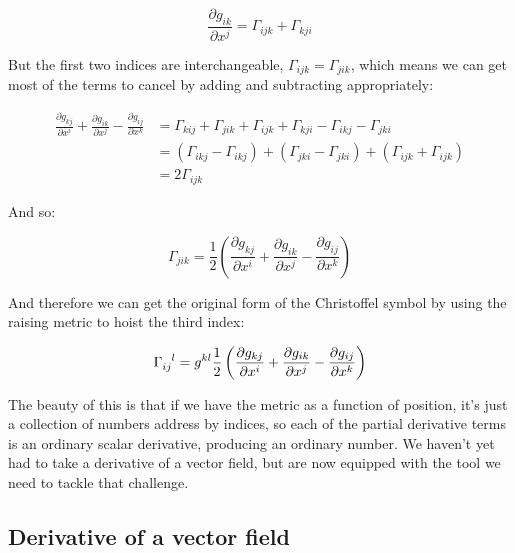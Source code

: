 \begin{equation}
\frac{\partial g_{ik}}{\partial x^j} 
=
\Gamma_{ijk}+\Gamma_{kji}
\end{equation}

But the first two indices are interchangeable, $\Gamma_{ijk} = \Gamma_{jik}$, which means we can get most of the terms to cancel by adding and subtracting appropriately:

\begin{equation}
    \begin{split}
        \frac{\partial g_{kj}}{\partial x^i} 
        +
        \frac{\partial g_{ik}}{\partial x^j} 
        -
        \frac{\partial g_{ij}}{\partial x^k}
        &=
        \Gamma_{kij}+\Gamma_{jik}
        +
        \Gamma_{ijk}+\Gamma_{kji}
        -
        \Gamma_{ikj}-\Gamma_{jki} \\
        &=        
        (\Gamma_{ikj}-\Gamma_{ikj})
        +
        (\Gamma_{jki}-\Gamma_{jki})
        +
        (\Gamma_{ijk}+\Gamma_{ijk}) \\
        &= 2\Gamma_{ijk}       
    \end{split}
\end{equation}

And so:

\begin{equation}
\Gamma_{jik}
=
\frac{1}{2}
\left(
\frac{\partial g_{kj}}{\partial x^i} 
+
\frac{\partial g_{ik}}{\partial x^j} 
-
\frac{\partial g_{ij}}{\partial x^k} 
\right)
\end{equation}

And therefore we can get the original form of the Christoffel symbol by using the raising metric to hoist the third index:

\begin{equation}
\Gamma\indices{_i_j^l}
=
g^{kl}
\frac{1}{2}
\left(
\frac{\partial g_{kj}}{\partial x^i} 
+
\frac{\partial g_{ik}}{\partial x^j} 
-
\frac{\partial g_{ij}}{\partial x^k} 
\right)
\end{equation}

The beauty of this is that if we have the metric as a function of position, it's just a collection of numbers address by indices, so each of the partial derivative terms is an ordinary scalar derivative, producing an ordinary number. We haven't yet had to take a derivative of a vector field, but are now equipped with the tool we need to tackle that challenge.

\subsection{Derivative of a vector field}

